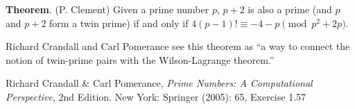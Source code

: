 \documentclass[12pt]{article}
\begin{document}
{\bf Theorem}. (P. Clement) Given a prime number $p$, $p + 2$ is also a prime (and $p$ and $p + 2$ form a twin prime) if and only if $4(p - 1)! \equiv -4 - p \pmod{p^2 + 2p}$.

Richard Crandall and Carl Pomerance see this theorem as ``a way to connect the notion of twin-prime pairs with the Wilson-Lagrange theorem.''

\begin{thebibliography}{1}
 Richard Crandall \& Carl Pomerance, {\it Prime Numbers: A Computational Perspective}, 2nd Edition. New York: Springer (2005): 65, Exercise 1.57
\end{thebibliography}
\end{document}
